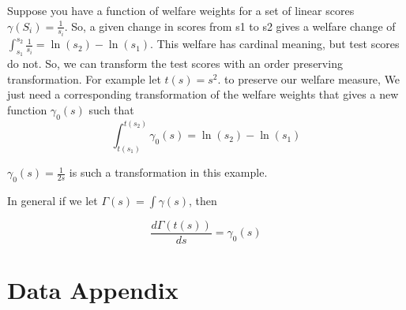 \documentclass{article}
\theoremstyle{definition}
\theoremstyle{definition}
\theoremstyle{definition}
\theoremstyle{definition}
\begin{document}
    Suppose you have a function of welfare weights for a set of linear scores $\gamma(S_i) = \frac{1}{s_i}$. So, a given change in scores from s1 to s2 gives a welfare change of $\int_{s_1}^{s_2} \frac{1}{s_i} = \ln(s_2)-\ln(s_1)$. This welfare has cardinal meaning, but test scores do not. So, we can transform the test scores with an order preserving transformation. For example let $t(s) = s^2$. to preserve our welfare measure, We just need a corresponding transformation of the welfare weights that gives a new function $\gamma_0(s)$ such that 
    $$\int_{t(s_1)}^{t(s_2)}\gamma_0(s)  = \ln(s_2)-\ln(s_1)$$
    
    $\gamma_0(s) = \frac{1}{2s}$ is such a transformation in this example. 
    
    In general if we let $\Gamma(s) = \int \gamma(s)$, then 
    
    $$ \frac{d \Gamma(t(s)) }{ ds} = \gamma_0(s) $$
    










\pagebreak







\appendix
\captionsetup{labelformat=AppendixTables}


\setcounter{figure}{0}   
\setcounter{table}{0}   

\renewcommand{\thetable}{\arabic{table}}
\renewcommand{\thefigure}{\arabic{figure}}



\section{Data Appendix} \label{data_app}
\end{document}
